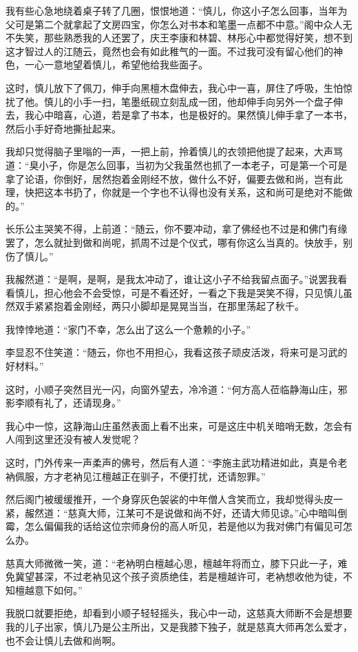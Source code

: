 我有些心急地绕着桌子转了几圈，恨恨地道：“慎儿，你这小子怎么回事，当年为父可是第二个就拿起了文房四宝，你怎么对书本和笔墨一点都不中意。”阁中众人无不失笑，那些熟悉我的人还罢了，庆王李康和林碧、林彤心中都觉得好笑，想不到这才智过人的江随云，竟然也会有如此稚气的一面。不过我可没有留心他们的神色，一心一意地望着慎儿，希望他给我些面子。

这时，慎儿放下了佩刀，伸手向黑檀木盘伸去，我心中一喜，屏住了呼吸，生怕惊扰了他。慎儿的小手一扫，笔墨纸砚立刻乱成一团，他却伸手向另外一个盘子伸去，我心中暗喜，心道，若是拿了书本，也是极好的。果然慎儿伸手拿了一本书，然后小手好奇地撕扯起来。

我却只觉得脑子里嗡的一声，一把上前，拎着慎儿的衣领把他提了起来，大声骂道：“臭小子，你是怎么回事，当初为父我虽然也抓了一本老子，可是第一个可是拿了论语，你倒好，居然抱着金刚经不放，做什么不好，偏要去做和尚，岂有此理，快把这本书扔了，你就是一个字也不认得也没有关系，这和尚可是绝对不能做的。”

长乐公主哭笑不得，上前道：“随云，你不要冲动，拿了佛经也不过是和佛门有缘罢了，怎么就扯到做和尚呢，抓周不过是个仪式，哪有你这么当真的。快放手，别伤了慎儿。”

我赧然道：“是啊，是啊，是我太冲动了，谁让这小子不给我留点面子。”说罢我看看慎儿，担心他会不会受惊，可是不看还好，一看之下我是哭笑不得，只见慎儿虽然双手紧紧抱着金刚经，两只小脚却是晃晃当当，在那里荡起了秋千。

我悻悻地道：“家门不幸，怎么出了这么一个惫赖的小子。”

李显忍不住笑道：“随云，你也不用担心，我看这孩子顽皮活泼，将来可是习武的好材料。”

这时，小顺子突然目光一闪，向窗外望去，冷冷道：“何方高人莅临静海山庄，邪影李顺有礼了，还请现身。”

我心中一惊，这静海山庄虽然表面上看不出来，可是这庄中机关暗哨无数，怎会有人闯到这里还没有被人发觉呢？

这时，门外传来一声柔声的佛号，然后有人道：“李施主武功精进如此，真是令老衲佩服，方才老衲见江檀越正在驯子，不便打扰，还请恕罪。”

然后阁门被缓缓推开，一个身穿灰色袈裟的中年僧人含笑而立，我却觉得头皮一紧，赧然道：“慈真大师，江某可不是说做和尚不好，还请大师见谅。”心中暗叫倒霉，怎么偏偏我的话给这位宗师身份的高人听见，若是他以为我对佛门有偏见可怎么办。

慈真大师微微一笑，道：“老衲明白檀越心思，檀越年将而立，膝下只此一子，难免冀望甚深，不过老衲见这个孩子资质绝佳，若是檀越许可，老衲想收他为徒，不知檀越意下如何。”

我脱口就要拒绝，却看到小顺子轻轻摇头，我心中一动，这慈真大师断不会是想要我的儿子出家，慎儿乃是公主所出，又是我膝下独子，就是慈真大师再怎么爱才，也不会让慎儿去做和尚啊。

